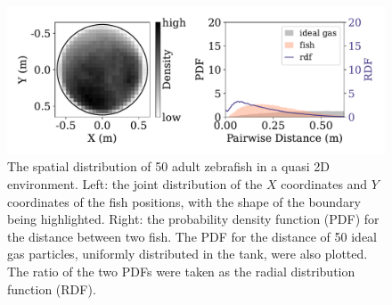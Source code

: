 \documentclass[11pt,twoside]{report}
\begin{document}
\begin{figure}
  \includegraphics[width=\linewidth]{dist-50-fish}
  \caption[The 2D spatial distribution of 50 fish]{The spatial distribution of 50 adult zebrafish in a quasi 2D environment. Left: the joint distribution of the $X$ coordinates and $Y$ coordinates of the fish positions, with the shape of the boundary being highlighted. Right: the probability density function (PDF) for the distance between two fish. The PDF for the distance of 50 ideal gas particles, uniformly distributed in the tank, were also plotted. The ratio of the two PDFs were taken as the radial distribution function (RDF).}
  \label{fig:density_2d_fish_50}
\end{figure}

\vfill
\pagebreak
\end{document}
